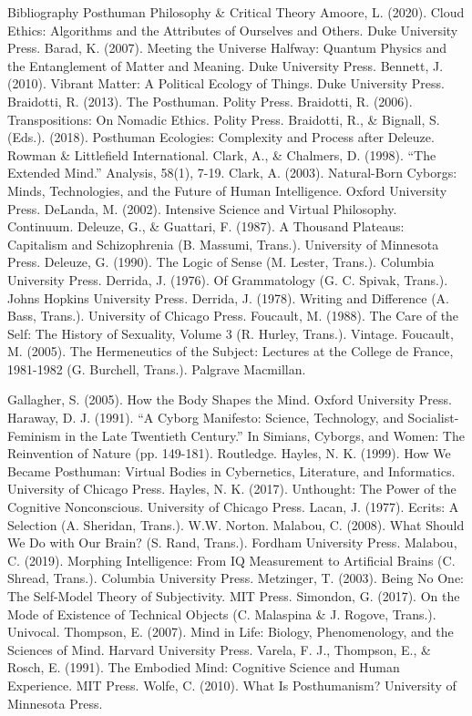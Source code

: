 \documentclass[11pt,a4paper,openany]{book}
\begin{document}
\iffalse
Bibliography Posthuman Philosophy \& Critical Theory Amoore, L. (2020). Cloud Ethics: Algorithms and the Attributes of Ourselves and Others. Duke University Press. Barad, K. (2007). Meeting the Universe Halfway: Quantum Physics and the Entanglement of Matter and Meaning. Duke University Press. Bennett, J. (2010). Vibrant Matter: A Political Ecology of Things. Duke University Press. Braidotti, R. (2013). The Posthuman. Polity Press. Braidotti, R. (2006). Transpositions: On Nomadic Ethics. Polity Press. Braidotti, R., \& Bignall, S. (Eds.). (2018). Posthuman Ecologies: Complexity and Process after Deleuze. Rowman \& Littlefield International. Clark, A., \& Chalmers, D. (1998). “The Extended Mind.” Analysis, 58(1), 7-19. Clark, A. (2003). Natural-Born Cyborgs: Minds, Technologies, and the Future of Human Intelligence. Oxford University Press. DeLanda, M. (2002). Intensive Science and Virtual Philosophy. Continuum. Deleuze, G., \& Guattari, F. (1987). A Thousand Plateaus: Capitalism and Schizophrenia (B. Massumi, Trans.). University of Minnesota Press. Deleuze, G. (1990). The Logic of Sense (M. Lester, Trans.). Columbia University Press. Derrida, J. (1976). Of Grammatology (G. C. Spivak, Trans.). Johns Hopkins University Press. Derrida, J. (1978). Writing and Difference (A. Bass, Trans.). University of Chicago Press. Foucault, M. (1988). The Care of the Self: The History of Sexuality, Volume 3 (R. Hurley, Trans.). Vintage. Foucault, M. (2005). The Hermeneutics of the Subject: Lectures at the College de France, 1981-1982 (G. Burchell, Trans.). Palgrave Macmillan.

Gallagher, S. (2005). How the Body Shapes the Mind. Oxford University Press. Haraway, D. J. (1991). “A Cyborg Manifesto: Science, Technology, and Socialist-Feminism in the Late Twentieth Century.” In Simians, Cyborgs, and Women: The Reinvention of Nature (pp. 149-181). Routledge. Hayles, N. K. (1999). How We Became Posthuman: Virtual Bodies in Cybernetics, Literature, and Informatics. University of Chicago Press. Hayles, N. K. (2017). Unthought: The Power of the Cognitive Nonconscious. University of Chicago Press. Lacan, J. (1977). Ecrits: A Selection (A. Sheridan, Trans.). W.W. Norton. Malabou, C. (2008). What Should We Do with Our Brain? (S. Rand, Trans.). Fordham University Press. Malabou, C. (2019). Morphing Intelligence: From IQ Measurement to Artificial Brains (C. Shread, Trans.). Columbia University Press. Metzinger, T. (2003). Being No One: The Self-Model Theory of Subjectivity. MIT Press. Simondon, G. (2017). On the Mode of Existence of Technical Objects (C. Malaspina \& J. Rogove, Trans.). Univocal. Thompson, E. (2007). Mind in Life: Biology, Phenomenology, and the Sciences of Mind. Harvard University Press. Varela, F. J., Thompson, E., \& Rosch, E. (1991). The Embodied Mind: Cognitive Science and Human Experience. MIT Press. Wolfe, C. (2010). What Is Posthumanism? University of Minnesota Press.
\end{document}
